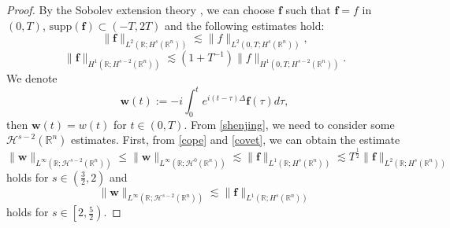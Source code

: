 \documentclass[preprint,compress,12pt]{elsarticle}
\numberwithin{equation}{section}
\begin{document}
\begin{proof}
	By the Sobolev extension theory \cite{leo}, we can choose $\boldsymbol{f}$ such that $\boldsymbol{f}=f$ in $(0,T)$, $\text{supp} (\boldsymbol{f})\subset(-T,2T)$ and the following estimates hold:
	\begin{equation}\label{y1}
		\|\boldsymbol{f}\|_{L^{2}(\mathbb{R};H^{s}(\mathbb{R}^{n}))}\lesssim\|f\|_{L^{2}(0,T;H^{s}(\mathbb{R}^{n}))},
	\end{equation}
	\begin{equation}\label{y11}
		\|\boldsymbol{f}\|_{H^{1}(\mathbb{R};H^{s-2}(\mathbb{R}^{n}))}\lesssim \left(1 + T^{-1}\right)\|f\|_{H^{1}(0,T;H^{s-2}(\mathbb{R}^{n}))}.
	\end{equation}
	We denote
	\begin{equation*}
		\boldsymbol{w}(t):=-i \int_{0}^{t}e^{i(t-\tau)\Delta}\boldsymbol{f}(\tau)d\tau,
	\end{equation*}
	then $\boldsymbol{w}(t)=w(t)$ for $t\in (0,T)$. From \eqref{shenjing}, we need to consider some $\mathcal{H}^{s-2}(\mathbb{R}^{n})$ estimates. First, from \eqref{cope} and \eqref{covet}, we can obtain the estimate
	\begin{equation}\label{w1} \|\boldsymbol{w}\|_{L^{\infty}(\mathbb{R};\mathcal{H}^{s-2}(\mathbb{R}^{n}))}\leq\|\boldsymbol{w}\|_{L^{\infty}(\mathbb{R};\mathcal{H}^{0}(\mathbb{R}^{n}))}\lesssim\|\boldsymbol{f}\|_{L^{1}(\mathbb{R};H^{s}(\mathbb{R}^{n}))}\lesssim T^{\frac{1}{2}} \|\boldsymbol{f}\|_{L^{2}(\mathbb{R};H^{s}(\mathbb{R}^{n}))}
	\end{equation}
	holds for $s\in\left(\frac{3}{2},2\right)$ and
	\begin{equation}\label{w2} \|\boldsymbol{w}\|_{L^{\infty}(\mathbb{R};\mathcal{H}^{s-2}(\mathbb{R}^{n}))}\lesssim\|\boldsymbol{f}\|_{L^{1}(\mathbb{R};H^{s}(\mathbb{R}^{n}))}
	\end{equation}
	holds for $s\in \left[2,\frac{5}{2}\right)$.
	

\end{proof}
\end{document}
